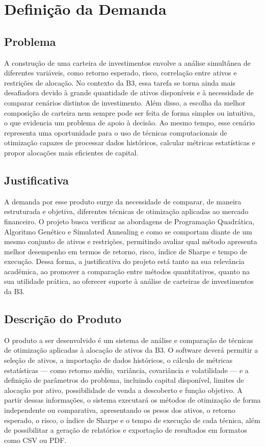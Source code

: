 \documentclass[
	12pt,				%
	openright,			%
	oneside,			    %
	a4paper,				%
	english,			%
	french,			%
	spanish,			%
	brazil			%
	]{abntex2}
\begin{document}
\chapter{Definição da Demanda}
\section{Problema}
A construção de uma carteira de investimentos envolve a análise simultânea de diferentes variáveis, como retorno esperado, risco, correlação entre ativos e restrições de alocação. No contexto da B3, essa tarefa se torna ainda mais desafiadora devido à grande quantidade de ativos disponíveis e à necessidade de comparar cenários distintos de investimento. Além disso, a escolha da melhor composição de carteira nem sempre pode ser feita de forma simples ou intuitiva, o que evidencia um problema de apoio à decisão. Ao mesmo tempo, esse cenário representa uma oportunidade para o uso de técnicas computacionais de otimização capazes de processar dados históricos, calcular métricas estatísticas e propor alocações mais eficientes de capital.

\section{Justificativa}
A demanda por esse produto surge da necessidade de comparar, de maneira estruturada e objetiva, diferentes técnicas de otimização aplicadas ao mercado financeiro. O projeto busca verificar as abordagens de Programação Quadrática, Algoritmo Genético e Simulated Annealing e como se comportam diante de um mesmo conjunto de ativos e restrições, permitindo avaliar qual método apresenta melhor desempenho em termos de retorno, risco, índice de Sharpe e tempo de execução. Dessa forma, a justificativa do projeto está tanto na sua relevância acadêmica, ao promover a comparação entre métodos quantitativos, quanto na sua utilidade prática, ao oferecer suporte à análise de carteiras de investimentos da B3.

\section{Descrição do Produto}
O produto a ser desenvolvido é um sistema de análise e comparação de técnicas de otimização aplicadas à alocação de ativos da B3. O software deverá permitir a seleção de ativos, a importação de dados históricos, o cálculo de métricas estatísticas — como retorno médio, variância, covariância e volatilidade — e a definição de parâmetros do problema, incluindo capital disponível, limites de alocação por ativo, possibilidade de venda a descoberto e função objetivo. A partir dessas informações, o sistema executará os métodos de otimização de forma independente ou comparativa, apresentando os pesos dos ativos, o retorno esperado, o risco, o índice de Sharpe e o tempo de execução de cada técnica, além de possibilitar a geração de relatórios e exportação de resultados em formatos como CSV ou PDF.
\end{document}
